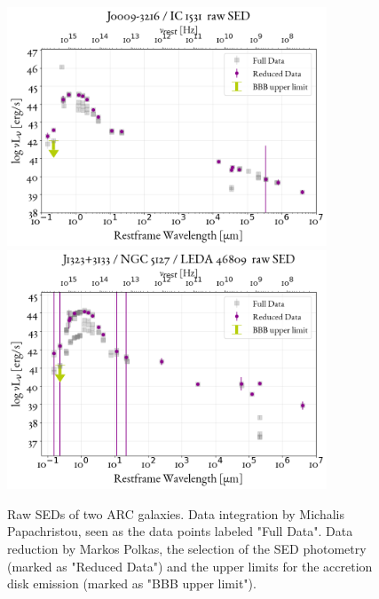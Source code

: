 \begin{figure}
\centering
  \includegraphics[width = 0.85\textwidth]{figures/DataSet/1_rawSED_16.png}
  \includegraphics[width = 0.85\textwidth]{figures/DataSet/91_rawSED_5255.png}
  \caption{Raw SEDs of two ARC galaxies. Data integration by Michalis Papachristou, seen as the data points labeled "Full Data". Data reduction by Markos Polkas, the selection of the SED photometry (marked as "Reduced Data") and the upper limits for the accretion disk emission (marked as "BBB upper limit").}
  \label{fig:RawSEDs}
\end{figure}








